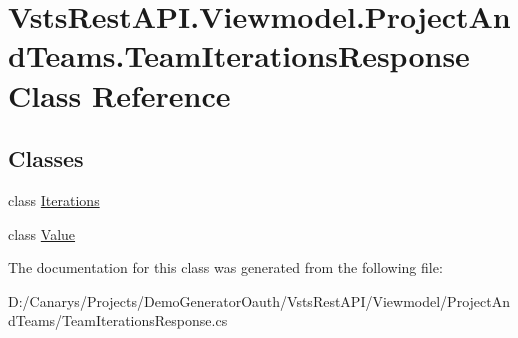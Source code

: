 \hypertarget{class_vsts_rest_a_p_i_1_1_viewmodel_1_1_project_and_teams_1_1_team_iterations_response}{}\section{Vsts\+Rest\+A\+P\+I.\+Viewmodel.\+Project\+And\+Teams.\+Team\+Iterations\+Response Class Reference}
\label{class_vsts_rest_a_p_i_1_1_viewmodel_1_1_project_and_teams_1_1_team_iterations_response}
\subsection*{Classes}
\begin{DoxyCompactItemize}
\item 
class \mbox{\hyperlink{class_vsts_rest_a_p_i_1_1_viewmodel_1_1_project_and_teams_1_1_team_iterations_response_1_1_iterations}{Iterations}}
\item 
class \mbox{\hyperlink{class_vsts_rest_a_p_i_1_1_viewmodel_1_1_project_and_teams_1_1_team_iterations_response_1_1_value}{Value}}
\end{DoxyCompactItemize}


The documentation for this class was generated from the following file\+:\begin{DoxyCompactItemize}
\item 
D\+:/\+Canarys/\+Projects/\+Demo\+Generator\+Oauth/\+Vsts\+Rest\+A\+P\+I/\+Viewmodel/\+Project\+And\+Teams/Team\+Iterations\+Response.\+cs\end{DoxyCompactItemize}
